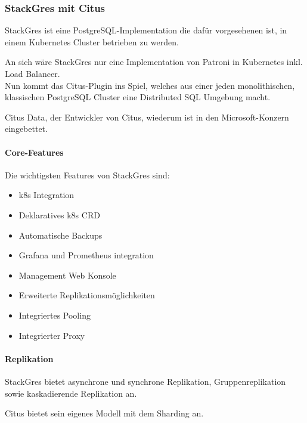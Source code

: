\subsubsection{StackGres mit Citus}
\begin{flushleft} 
    StackGres ist eine \Gls{PostgreSQL}-Implementation die dafür vorgesehenen ist, in einem Kubernetes Cluster betrieben zu werden.
\end{flushleft} 
\begin{flushleft}
    An sich wäre StackGres nur eine Implementation von Patroni in Kubernetes inkl. Load Balancer.\\
    Nun kommt das Citus-Plugin ins Spiel, welches aus einer jeden monolithischen, klassischen \Gls{PostgreSQL Cluster} eine Distributed SQL Umgebung macht.
\end{flushleft}
\begin{flushleft}
    Citus Data, der Entwickler von Citus, wiederum ist in den Microsoft-Konzern eingebettet.
\end{flushleft}
\begin{flushleft}
    \paragraph{Core-Features}
    Die wichtigsten Features von StackGres sind\cite{G3XQA8PI}:
    \begin{itemize}
        \item k8s Integration
        \item Deklaratives k8s CRD
        \item Automatische Backups
        \item Grafana und Prometheus integration
        \item Management Web Konsole
        \item Erweiterte Replikationsmöglichkeiten
        \item Integriertes Pooling
        \item Integrierter Proxy
    \end{itemize}
\end{flushleft}
\begin{flushleft}
    \paragraph{Replikation}
    StackGres bietet asynchrone und synchrone Replikation, Gruppenreplikation sowie kaskadierende Replikation an.
\end{flushleft}
\begin{flushleft}
    Citus bietet sein eigenes Modell mit dem Sharding an.
\end{flushleft}

